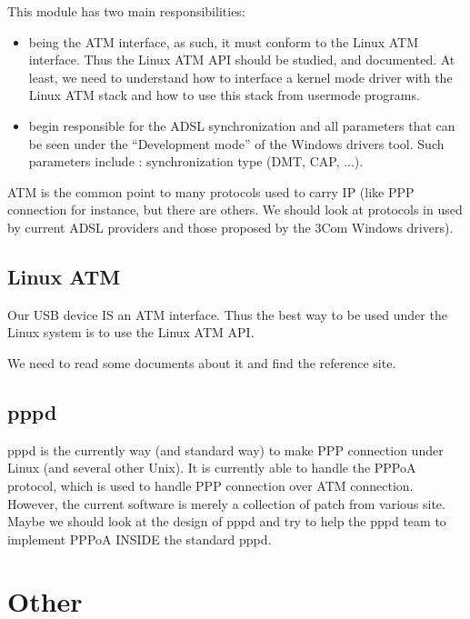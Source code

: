 \documentclass[a4paper,12pt]{article}
\begin{document}
This module has two main responsibilities:

\begin{itemize}
  
\item being the ATM interface, as such, it must conform to the Linux
  ATM interface. Thus the Linux ATM API should be studied, and
  documented. At least, we need to understand how to interface a
  kernel mode driver with the Linux ATM stack and how to use this
  stack from usermode programs.
  
\item begin responsible for the ADSL synchronization and all
  parameters that can be seen under the ``Development mode'' of the
  Windows drivers tool. Such parameters include : synchronization type
  (DMT, CAP, ...).

\end{itemize}

ATM is the common point to many protocols used to carry IP (like PPP
connection for instance, but there are others. We should look at
protocols in used by current ADSL providers and those proposed by the
3Com Windows drivers).

\subsection{Linux ATM}

Our USB device IS an ATM interface. Thus the best way to be used under
the Linux system is to use the Linux ATM API.

We need to read some documents about it and find the reference site.

\subsection{pppd}

pppd is the currently way (and standard way) to make PPP connection
under Linux (and several other Unix). It is currently able to handle
the PPPoA protocol, which is used to handle PPP connection over ATM
connection. However, the current software is merely a collection of
patch from various site. Maybe we should look at the design of pppd
and try to help the pppd team to implement PPPoA INSIDE the standard
pppd.

\section{Other}
\end{document}

